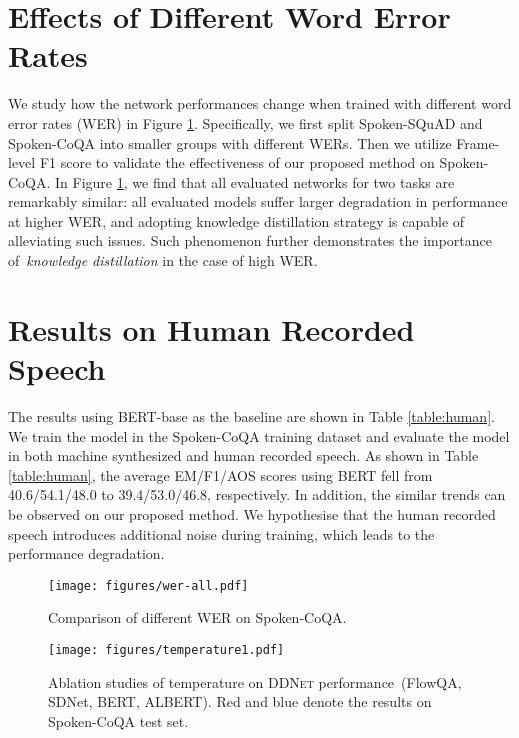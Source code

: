 \documentclass[11pt]{article}
\begin{document}
\section{Effects of Different Word Error Rates}
We study how the network performances change when trained with different word error rates (WER) in Figure \ref{fig:wer}. Specifically, we first split Spoken-SQuAD and Spoken-CoQA into smaller groups with different WERs. Then we utilize Frame-level F1 score \cite{chuang2019speechbert} to validate the effectiveness of our proposed method on Spoken-CoQA. In Figure \ref{fig:wer}, we find that all evaluated networks for two tasks are remarkably similar: all evaluated models suffer larger degradation in performance at higher WER, and adopting knowledge distillation strategy is capable of alleviating such issues. Such phenomenon further demonstrates the importance of~\textit{knowledge distillation} in the case of high WER.

\section{Results on Human Recorded Speech}
The results using BERT-base as the baseline are shown in Table \ref{table:human}. We train the model in the Spoken-CoQA training dataset and evaluate the model in both machine synthesized and human recorded speech. As shown in Table \ref{table:human}, the average EM/F1/AOS scores using BERT fell from 40.6/54.1/48.0 to 39.4/53.0/46.8, respectively. In addition, the similar trends can be observed on our proposed method. We hypothesise that the human recorded speech introduces additional noise during training, which leads to the performance degradation.

\begin{figure}[h]
    \centering
    \texttt{[image: figures/wer-all.pdf]}
    \vspace{-10pt}
    \caption{Comparison of different WER on Spoken-CoQA.}
    \vspace{-15pt}
    \label{fig:wer}
\end{figure}

\begin{figure*}[t]
    \centering
    \texttt{[image: figures/temperature1.pdf]}
    \vspace{-10pt}
    \caption{Ablation studies of temperature  on \textsc{DDNet} performance~(FlowQA, SDNet, BERT, ALBERT). Red and blue denote the results on  Spoken-CoQA test set.}
    \label{fig:t}
    \vspace{-15pt}
\end{figure*}
\end{document}

